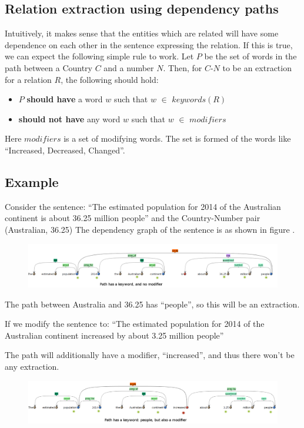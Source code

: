 \documentclass[a4paper,10pt]{article}
\begin{document}
\subsection{Relation extraction using dependency paths}
Intuitively, it makes sense that the entities which are related will have some dependence on each other in the sentence 
expressing the relation. If this is true, we can expect the following simple rule to work.
Let $P$ be the set of words in the path between a Country $C$ and a number $N$. Then, for $C$-$N$ to be an extraction for a relation
$R$, the following should hold:
  \begin{itemize}
   \item $P$ \textbf{should have} a word $w$ such that $w$ $\in$ $keywords(R)$
   \item \textbf{should not have} any word $w$ such that $w$ $\in$ $modifiers$
  \end{itemize}
  
Here $modifiers$ is a set of modifying words. The set is formed of the words like {``Increased, Decreased, 
Changed''}.

\subsection{Example}
Consider the sentence:
``The estimated population for 2014 of the Australian continent	is about 36.25 million people''
and the Country-Number pair (Australian, 36.25)
The dependency graph of the sentence is as shown in figure \cite{pos}.
\begin{figure}[H]
 \centering
 \includegraphics[bb=0 0 1292 228,scale=0.3]{./dep_pos.png}
 \label{pos}
\end{figure}
The path between Australia and 36.25 has ``people'', so this will be an extraction.

If we modify the sentence to:
``The estimated population for 2014 of the Australian continent	increased by about 3.25 million people''

The path will additionally have a modifier, ``increased'', and thus there won't be any extraction.
\begin{figure}[H]
 \centering
 \includegraphics[bb=0 0 1292 228,scale=0.3]{./dep_neg.png}
 \label{neg}
\end{figure}
\end{document}
